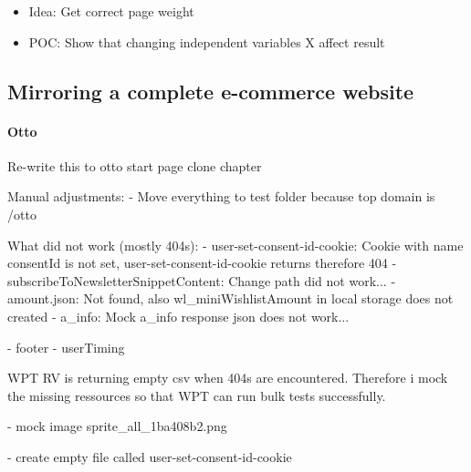 \begin{itemize}
    \item Idea: Get correct page weight
    \item POC: Show that changing independent variables X affect result
\end{itemize}









\subsection{Mirroring a complete e-commerce website}

\paragraph{Otto}

Re-write this to otto start page clone chapter

Manual adjustments:
- Move everything to test folder because top domain is /otto

What did not work (mostly 404s):
- user-set-consent-id-cookie: Cookie with name consentId is not set, user-set-consent-id-cookie returns therefore 404
- subscribeToNewsletterSnippetContent: Change path did not work...
- amount.json: Not found, also wl\_miniWishlistAmount in local storage does not created
- a\_info: Mock a\_info response json does not work...

- footer
- userTiming


WPT RV is returning empty csv when 404s are encountered.
Therefore i mock the missing ressources so that WPT can run bulk tests successfully.

- mock image sprite\_all\_1ba408b2.png

- create empty file called user-set-consent-id-cookie

